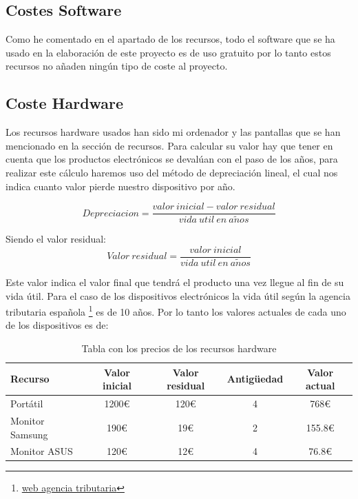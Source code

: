 \subsection{Costes Software}
Como he comentado en el apartado de los recursos, todo el software que se ha usado en la elaboración de este proyecto es de uso gratuito por lo tanto estos recursos no añaden ningún tipo de coste al proyecto.

\subsection{Coste Hardware}
Los recursos hardware usados han sido mi ordenador y las pantallas que se han mencionado en la sección de recursos. Para calcular su valor hay que tener en cuenta que los productos electrónicos se devalúan con el paso de los años, para realizar este cálculo haremos uso del método de depreciación lineal, el cual nos indica cuanto valor pierde nuestro dispositivo por año.

\begin{equation}
    Depreciacion = \frac{valor\ inicial - valor\ residual}{vida\ util\ en\ a\tilde{n}os}
\end{equation}

Siendo el valor residual:
\begin{equation}
    Valor\ residual = \frac{valor\ inicial}{vida\ util\ en\ a\tilde{n}os}
\end{equation}

Este valor indica el valor final que tendrá el producto una vez llegue al fin de su vida útil. Para el caso de los dispositivos electrónicos la vida útil según la agencia tributaria española \footnote{\href{https://sede.agenciatributaria.gob.es/Sede/ayuda/manuales-videos-folletos/manuales-practicos/irpf-2019/capitulo-7-rendimientos-actividades-economicas-directa/fase-1-determinacion-rendimiento-neto/amortizaciones-dotaciones-ejercicio-fiscalmente-deducibles/requisitos-generales/coeficientes-amortizacion-lineal.html}{web agencia tributaria}} es de 10 años. Por lo tanto los valores actuales de cada uno de los dispositivos es de:

\begin{table}[H]
    \renewcommand{\arraystretch}{1.5}
    \centering
    \begin{tabular}{lcccc}
        \toprule[0.75mm]
        {\textbf{Recurso}} & \textbf{Valor inicial} & \textbf{Valor residual} & \textbf{Antigüedad} & \textbf{Valor actual}\\
        \hline
        Portátil & 1200€ & 120€ & 4 & 768€\\
        \hline
        Monitor Samsung & 190€ & 19€ & 2 & 155.8€\\
        \hline
        Monitor ASUS & 120€ & 12€ & 4 & 76.8€\\
        \bottomrule[0.75mm]
    \end{tabular}
    \caption{Tabla con los precios de los recursos hardware}
\end{table}

